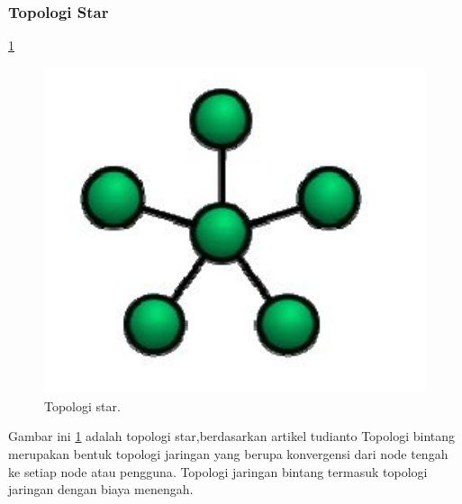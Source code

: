   \subsubsection{Topologi Star}
    \ref{star}
    \begin{figure}[ht]
    \centerline{\includegraphics[width=1\textwidth]{figures/star.JPG}}
    \caption{Topologi star.}
    \label{star}
    \end{figure}
    Gambar ini \ref{star} adalah topologi star,berdasarkan artikel tudianto Topologi bintang merupakan bentuk topologi jaringan yang berupa konvergensi dari node tengah ke setiap node atau pengguna\cite{yudianto2007jaringan}. Topologi jaringan bintang termasuk topologi jaringan dengan biaya menengah.
